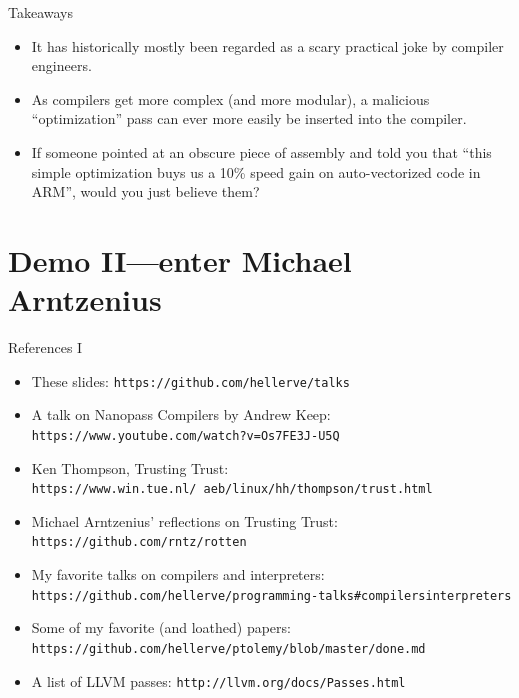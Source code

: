 \documentclass[aspectratio=169]{beamer}
\begin{document}
  \begin{frame}{Takeaways}
    \begin{itemize}
      \item It has historically mostly been regarded as a scary practical joke
            by compiler engineers.
      \item As compilers get more complex (and more modular), a malicious
            “optimization” pass can ever more easily be inserted into the
            compiler.
      \item If someone pointed at an obscure piece of assembly and told you
            that “this simple optimization buys us a 10\% speed gain on
            auto-vectorized code in ARM”, would you just believe them?
    \end{itemize}
  \end{frame}
  \section{Demo II—enter Michael Arntzenius}
  \begin{frame}{References I}
    \begin{itemize}
      \item These slides: \texttt{https://github.com/hellerve/talks}
      \item A talk on Nanopass Compilers by Andrew Keep: \texttt{https://www.youtube.com/watch?v=Os7FE3J-U5Q}
      \item Ken Thompson, Trusting Trust: \texttt{https://www.win.tue.nl/~aeb/linux/hh/thompson/trust.html}
      \item Michael Arntzenius’ reflections on Trusting Trust: \texttt{https://github.com/rntz/rotten}
      \item My favorite talks on compilers and interpreters: \texttt{https://github.com/hellerve/programming-talks\#compilersinterpreters}
      \item Some of my favorite (and loathed) papers: \texttt{https://github.com/hellerve/ptolemy/blob/master/done.md}
      \item A list of LLVM passes: \texttt{http://llvm.org/docs/Passes.html}
    \end{itemize}
  \end{frame}
\end{document}
